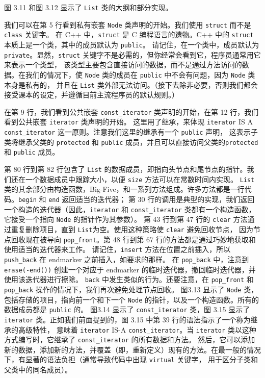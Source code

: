 \documentclass[a4paper]{ctexart}
\theoremstyle{definition}
\theoremstyle{definition}
\begin{document}
图 3.11 和图 3.12 显示了 \verb|List| 类的大纲和部分实现。

我们可以在第 5 行看到私有嵌套 \verb|Node| 类声明的开始。我们使用 \verb|struct| 而不是 \verb|class| 关键字。
在 C++ 中，\verb|struct| 是 C 编程语言的遗物。C++ 中的 \verb|struct| 本质上是一个类，其中的成员默认为 \verb|public|。
请记住，在一个类中，成员默认为 \verb|private|。显然，\verb|struct| 关键字不是必需的，但你经常会看到它，程序员通常用它来表示一个类型，
该类型主要包含直接访问的数据，而不是通过方法访问的数据。在我们的情况下，使 \verb|Node| 类的成员在 \verb|public| 中不会有问题，因为 \verb|Node| 类本身是私有的，
并且在 \verb|List| 类外部无法访问。（接下去除非必要，否则我们都会接受课本的设定，并遵循目前主流程序员的默认规则。）

在第 9 行，我们看到公共嵌套 \verb|const_iterator| 类声明的开始，在第 12 行，我们看到公共嵌套 \verb|iterator| 类声明的开始。
这里用了继承，来体现 \verb|iterator| IS A \verb|const_iterator| 这一原则。注意我们这里的继承有一个 \verb|public| 声明，
这表示子类将继承父类的 \verb|protected| 和 \verb|public| 成员，并且可以直接访问父类的\verb|protected| 和 \verb|public| 成员。

第 80 行到第 82 行包含了 \verb|List| 的数据成员，即指向头节点和尾节点的指针。我们还在一个数据成员中跟踪大小，以便 \verb|size| 方法可以在常数时间内实现。
\verb|List| 类的其余部分由构造函数，Big-Five，和一系列方法组成。许多方法都是一行代码。\verb|begin| 和 \verb|end| 返回适当的迭代器；
第 30 行的调用是典型的实现，我们返回一个构造的迭代器（因此，\verb|iterator| 和 \verb|const_iterator| 类都有一个构造函数，
它接受一个指向 \verb|Node| 的指针作为其参数）。
第 43 行到第 47 行的 \verb|clear| 方法通过重复删除项目，直到 \verb|List|为空。使用这种策略使 \verb|clear| 避免回收节点，
因为节点回收现在被导向 \verb|pop_front|。第 48 行到第 67 行的方法都是通过巧妙地获取和使用适当的迭代器来工作。
请记住，\verb|insert| 方法在位置之前插入，所以 \verb|push_back| 在 endmarker 之前插入，如要求的那样。
在 \verb|pop_back| 中，注意到 \verb|erase(-end())| 创建一个对应于 endmarker 的临时迭代器，撤回临时迭代器，并使用该迭代器进行擦除。
\verb|back| 中发生类似的行为。还要注意，在 \verb|pop_front| 和 \verb|pop_back| 操作的情况下，我们再次避免处理节点回收。
图3.13 显示了 \verb|Node| 类，包括存储的项目，指向前一个和下一个 \verb|Node| 的指针，以及一个构造函数。所有的数据成员都是 \verb|public| 的。
图3.14 显示了 \verb|const_iterator| 类，图 3.15 显示了 \verb|iterator| 类。正如我们前面提到的，图 3.15 中第 39 行的语法指示了一个称为继承的高级特性，
意味着 \verb|iterator| IS-A \verb|const_iterator|。当 \verb|iterator| 类以这种方式编写时，它继承了 \verb|const_iterator| 的所有数据和方法。
然后，它可以添加新的数据，添加新的方法，并覆盖（即，重新定义）现有的方法。在最一般的情况下，有显著的语法负担（通常导致代码中出现 \verb|virtual| 关键字，
用于区分子类和父类中的同名成员）。
\end{document}
